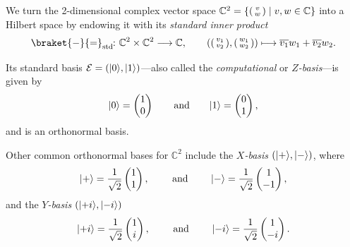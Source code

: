\documentclass[a4paper, oneside, 12pt]{amsart}
\begin{document}
\begin{example}\label{ex:c2-as-Hilbert-space}
  We turn the 2-dimensional complex vector space  \(\mathbb{C}^2=\{\begin{psmallmatrix} v \\ w \end{psmallmatrix} \mid v,w \in \mathbb{C}\}\) into a Hilbert space by endowing it with its \emph{standard inner product}
  \begin{equation*}
    \braket{ \blank }{\bblank}_{\mathrm{std}} \from \mathbb{C}^{2}\times \mathbb{C}^{2}\to \mathbb{C}, \qquad
    \left( \begin{psmallmatrix} v_1 \\ v_2 \end{psmallmatrix}, \begin{psmallmatrix} w_1 \\ w_2 \end{psmallmatrix} \right) \mapsto \overline{v_{1}}w_{1} + \overline{v_{2}}w_{2}.
  \end{equation*}

  Its standard basis \(\mathcal{E}= (\lvert0\rangle, \lvert1\rangle)\)---also called the \emph{computational} or \emph{\(Z\)-basis}---is given by
  \begin{equation*}
    \lvert0\rangle = \begin{pmatrix} 1 \\ 0 \end{pmatrix}\qquad \text{and}\qquad
    \lvert1\rangle = \begin{pmatrix} 0 \\ 1 \end{pmatrix},
  \end{equation*}
  and is an orthonormal basis.

  Other common orthonormal bases for \(\mathbb{C}^2\) include the \emph{\(X\)-basis} \((\lvert+\rangle, \lvert-\rangle)\), where
  \begin{equation*}
    \lvert+\rangle = \frac{1}{\sqrt{2}} \begin{pmatrix} 1 \\ 1 \end{pmatrix}, \qquad \text{ and } \qquad
    \lvert-\rangle = \frac{1}{\sqrt{2}} \begin{pmatrix} 1 \\ -1 \end{pmatrix},
  \end{equation*}
  and the \emph{\(Y\)-basis} \((\lvert+i\rangle, \lvert-i\rangle)\)
  \begin{equation*}
    \lvert+i\rangle = \frac{1}{\sqrt{2}} \begin{pmatrix} 1 \\ i \end{pmatrix}, \qquad \text{ and } \qquad
    \lvert-i\rangle = \frac{1}{\sqrt{2}} \begin{pmatrix} 1 \\ -i \end{pmatrix}.
  \end{equation*}
\end{example}
\end{document}
